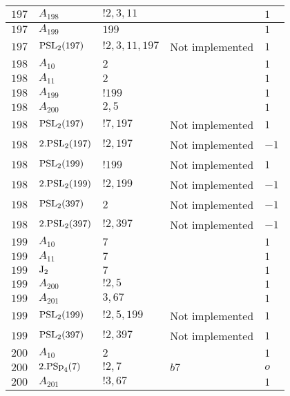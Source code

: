 \documentclass[a4paper, 11pt]{article}
\begin{document}
\begin{longtable}{lllll}
        $ 197 $ & $ A_{198} $ & $ !2, 3, 11 $ & $ ~ $ & $ 1$ \\ \hline
        $ 197 $ & $ A_{199} $ & $ 199 $ & $ ~ $ & $ 1$ \\ \hline
        $ 197 $ & $ {\rm PSL}_{2}(197) $ & $ !2, 3, 11, 197 $ &  Not implemented & $ 1$ \\ \hline
        $ 198 $ & $ A_{10} $ & $ 2 $ & $ ~ $ & $ 1$ \\ \hline
        $ 198 $ & $ A_{11} $ & $ 2 $ & $ ~ $ & $ 1$ \\ \hline
        $ 198 $ & $ A_{199} $ & $ !199 $ & $ ~ $ & $ 1$ \\ \hline
        $ 198 $ & $ A_{200} $ & $ 2, 5 $ & $ ~ $ & $ 1$ \\ \hline
        $ 198 $ & $ {\rm PSL}_{2}(197) $ & $ !7, 197 $ &  Not implemented & $ 1$ \\ \hline
        $ 198 $ & $ 2.{\rm PSL}_{2}(197) $ & $ !2, 197 $ &  Not implemented & $ -1$ \\ \hline
        $ 198 $ & $ {\rm PSL}_{2}(199) $ & $ !199 $ &  Not implemented & $ 1$ \\ \hline
        $ 198 $ & $ 2.{\rm PSL}_{2}(199) $ & $ !2, 199 $ &  Not implemented & $ -1$ \\ \hline
        $ 198 $ & $ {\rm PSL}_{2}(397) $ & $ 2 $ &  Not implemented & $ -1$ \\ \hline
        $ 198 $ & $ 2.{\rm PSL}_{2}(397) $ & $ !2, 397 $ &  Not implemented & $ -1$ \\ \hline
        $ 199 $ & $ A_{10} $ & $ 7 $ & $ ~ $ & $ 1$ \\ \hline
        $ 199 $ & $ A_{11} $ & $ 7 $ & $ ~ $ & $ 1$ \\ \hline
        $ 199 $ & $ {\rm J}_2 $ & $ 7 $ & $ ~ $ & $ 1$ \\ \hline
        $ 199 $ & $ A_{200} $ & $ !2, 5 $ & $ ~ $ & $ 1$ \\ \hline
        $ 199 $ & $ A_{201} $ & $ 3, 67 $ & $ ~ $ & $ 1$ \\ \hline
        $ 199 $ & $ {\rm PSL}_{2}(199) $ & $ !2, 5, 199 $ &  Not implemented & $ 1$ \\ \hline
        $ 199 $ & $ {\rm PSL}_{2}(397) $ & $ !2, 397 $ &  Not implemented & $ 1$ \\ \hline
        $ 200 $ & $ A_{10} $ & $ 2 $ & $ ~ $ & $ 1$ \\ \hline
        $ 200 $ & $ 2.{\rm PSp}_{4}(7) $ & $ ! 2,7 $ & $ b7 $ & $ o$ \\ \hline
        $ 200 $ & $ A_{201} $ & $ !3, 67 $ & $ ~ $ & $ 1$ \\ \hline

\end{longtable}
\end{document}
